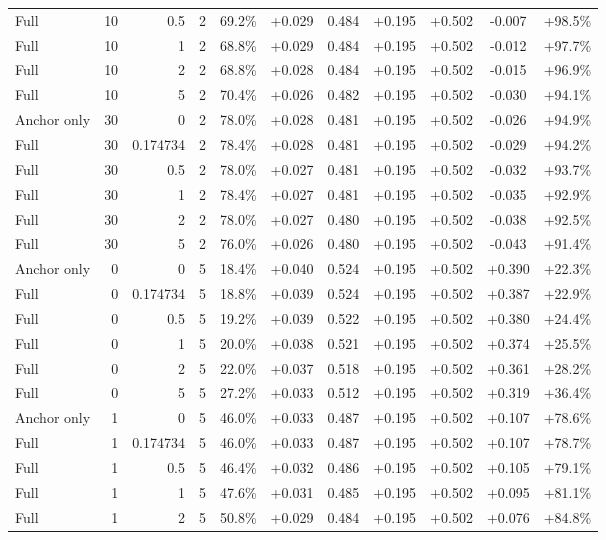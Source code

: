 \begin{table}[htbp]
\begin{tabular}{lrrrccccccc}
Full & 10 & 0.5 & 2 & 69.2\% & +0.029 & 0.484 & +0.195 & +0.502 & -0.007 & +98.5\% \\
Full & 10 & 1 & 2 & 68.8\% & +0.029 & 0.484 & +0.195 & +0.502 & -0.012 & +97.7\% \\
Full & 10 & 2 & 2 & 68.8\% & +0.028 & 0.484 & +0.195 & +0.502 & -0.015 & +96.9\% \\
Full & 10 & 5 & 2 & 70.4\% & +0.026 & 0.482 & +0.195 & +0.502 & -0.030 & +94.1\% \\
Anchor only & 30 & 0 & 2 & 78.0\% & +0.028 & 0.481 & +0.195 & +0.502 & -0.026 & +94.9\% \\
Full & 30 & 0.174734 & 2 & 78.4\% & +0.028 & 0.481 & +0.195 & +0.502 & -0.029 & +94.2\% \\
Full & 30 & 0.5 & 2 & 78.0\% & +0.027 & 0.481 & +0.195 & +0.502 & -0.032 & +93.7\% \\
Full & 30 & 1 & 2 & 78.4\% & +0.027 & 0.481 & +0.195 & +0.502 & -0.035 & +92.9\% \\
Full & 30 & 2 & 2 & 78.0\% & +0.027 & 0.480 & +0.195 & +0.502 & -0.038 & +92.5\% \\
Full & 30 & 5 & 2 & 76.0\% & +0.026 & 0.480 & +0.195 & +0.502 & -0.043 & +91.4\% \\
Anchor only & 0 & 0 & 5 & 18.4\% & +0.040 & 0.524 & +0.195 & +0.502 & +0.390 & +22.3\% \\
Full & 0 & 0.174734 & 5 & 18.8\% & +0.039 & 0.524 & +0.195 & +0.502 & +0.387 & +22.9\% \\
Full & 0 & 0.5 & 5 & 19.2\% & +0.039 & 0.522 & +0.195 & +0.502 & +0.380 & +24.4\% \\
Full & 0 & 1 & 5 & 20.0\% & +0.038 & 0.521 & +0.195 & +0.502 & +0.374 & +25.5\% \\
Full & 0 & 2 & 5 & 22.0\% & +0.037 & 0.518 & +0.195 & +0.502 & +0.361 & +28.2\% \\
Full & 0 & 5 & 5 & 27.2\% & +0.033 & 0.512 & +0.195 & +0.502 & +0.319 & +36.4\% \\
Anchor only & 1 & 0 & 5 & 46.0\% & +0.033 & 0.487 & +0.195 & +0.502 & +0.107 & +78.6\% \\
Full & 1 & 0.174734 & 5 & 46.0\% & +0.033 & 0.487 & +0.195 & +0.502 & +0.107 & +78.7\% \\
Full & 1 & 0.5 & 5 & 46.4\% & +0.032 & 0.486 & +0.195 & +0.502 & +0.105 & +79.1\% \\
Full & 1 & 1 & 5 & 47.6\% & +0.031 & 0.485 & +0.195 & +0.502 & +0.095 & +81.1\% \\
Full & 1 & 2 & 5 & 50.8\% & +0.029 & 0.484 & +0.195 & +0.502 & +0.076 & +84.8\% \\

\end{tabular}
\end{table}

